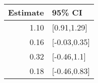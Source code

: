 \begin{tabular}{rl}
  \hline
Estimate & 95\% CI \\ 
  \hline
1.10 & [0.91,1.29] \\ 
  0.16 & [-0.03,0.35] \\ 
  0.32 & [-0.46,1.1] \\ 
  0.18 & [-0.46,0.83] \\ 
   \hline
\end{tabular}

